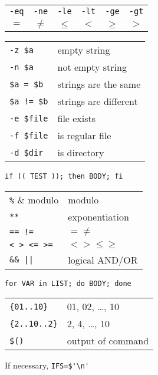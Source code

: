 \documentclass[a4paper, twocolumn]{article}
\renewcommand{\tt}{\texttt}
\begin{document}
\begin{tabular}{cccccc}
    \verb|-eq| & \verb|-ne| & \verb|-le| & \verb|-lt| & \verb|-ge| & \verb|-gt| \\
    $=$        & $\neq$     & $\leq$     & $<$        & $\geq$     & $>$
\end{tabular}
\vspace{0.3cm}

\begin{tabular}{ll}
    \verb|-z $a|        & empty string                              \\
    \verb|-n $a|        & not empty string                          \\
    \verb|$a = $b|      & strings are the same                      \\
    \verb|$a != $b|     & strings are different                     \\
    \verb|-e $file|     & file exists                               \\
    \verb|-f $file|     & is regular file                           \\
    \verb|-d $dir|      & is directory
\end{tabular}
\vspace{0.5cm}

\tt{if (( TEST )); then BODY; fi}
\vspace{0.3cm}

\begin{tabular}{ll}
    \verb|%|            & modulo                                    \\
    \verb|**|           & exponentiation                            \\
    \verb|== !=|        & $= \neq$                                  \\
    \verb|< > <= >=|    & $< > \leq \geq$                           \\
    \verb!&& ||!        & logical AND/OR
\end{tabular}
\vspace{0.5cm}

\tt{for VAR in LIST; do BODY; done}
\vspace{0.3cm}

\begin{tabular}{ll}
    \verb|{01..10}|     & 01, 02, …, 10                             \\
    \verb|{2..10..2}|   & 2, 4, …, 10                               \\
    \verb|$()|          & output of command
\end{tabular}
\vspace{0.3cm}

If necessary, \verb|IFS=$'\n'|
\end{document}
